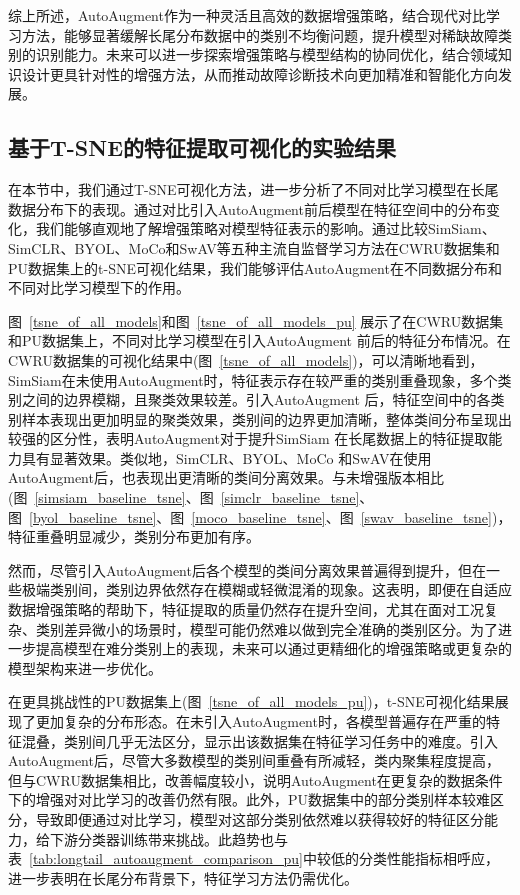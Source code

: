 \documentclass[master]{thesis-uestc}
\begin{document}
综上所述，AutoAugment作为一种灵活且高效的数据增强策略，结合现代对比学习方法，能够显著缓解长尾分布数据中的类别不均衡问题，提升模型对稀缺故障类别的识别能力。未来可以进一步探索增强策略与模型结构的协同优化，结合领域知识设计更具针对性的增强方法，从而推动故障诊断技术向更加精准和智能化方向发展。
\FloatBarrier

\subsection{基于T-SNE的特征提取可视化的实验结果}
在本节中，我们通过T-SNE可视化方法，进一步分析了不同对比学习模型在长尾数据分布下的表现。通过对比引入AutoAugment前后模型在特征空间中的分布变化，我们能够直观地了解增强策略对模型特征表示的影响。通过比较SimSiam、SimCLR、BYOL、MoCo和SwAV等五种主流自监督学习方法在CWRU数据集和PU数据集上的t-SNE可视化结果，我们能够评估AutoAugment在不同数据分布和不同对比学习模型下的作用。

图~\ref{tsne_of_all_models}和图~\ref{tsne_of_all_models_pu} 展示了在CWRU数据集和PU数据集上，不同对比学习模型在引入AutoAugment 前后的特征分布情况。在CWRU数据集的可视化结果中(图~\ref{tsne_of_all_models})，可以清晰地看到，SimSiam在未使用AutoAugment时，特征表示存在较严重的类别重叠现象，多个类别之间的边界模糊，且聚类效果较差。引入AutoAugment 后，特征空间中的各类别样本表现出更加明显的聚类效果，类别间的边界更加清晰，整体类间分布呈现出较强的区分性，表明AutoAugment对于提升SimSiam 在长尾数据上的特征提取能力具有显著效果。类似地，SimCLR、BYOL、MoCo 和SwAV在使用AutoAugment后，也表现出更清晰的类间分离效果。与未增强版本相比(图~\ref{simsiam_baseline_tsne}、图~\ref{simclr_baseline_tsne}、图~\ref{byol_baseline_tsne}、图~\ref{moco_baseline_tsne}、图~\ref{swav_baseline_tsne})，特征重叠明显减少，类别分布更加有序。

然而，尽管引入AutoAugment后各个模型的类间分离效果普遍得到提升，但在一些极端类别间，类别边界依然存在模糊或轻微混淆的现象。这表明，即便在自适应数据增强策略的帮助下，特征提取的质量仍然存在提升空间，尤其在面对工况复杂、类别差异微小的场景时，模型可能仍然难以做到完全准确的类别区分。为了进一步提高模型在难分类别上的表现，未来可以通过更精细化的增强策略或更复杂的模型架构来进一步优化。

在更具挑战性的PU数据集上(图~\ref{tsne_of_all_models_pu})，t-SNE可视化结果展现了更加复杂的分布形态。在未引入AutoAugment时，各模型普遍存在严重的特征混叠，类别间几乎无法区分，显示出该数据集在特征学习任务中的难度。引入AutoAugment后，尽管大多数模型的类别间重叠有所减轻，类内聚集程度提高，但与CWRU数据集相比，改善幅度较小，说明AutoAugment在更复杂的数据条件下的增强对对比学习的改善仍然有限。此外，PU数据集中的部分类别样本较难区分，导致即便通过对比学习，模型对这部分类别依然难以获得较好的特征区分能力，给下游分类器训练带来挑战。此趋势也与表~\ref{tab:longtail_autoaugment_comparison_pu}中较低的分类性能指标相呼应，进一步表明在长尾分布背景下，特征学习方法仍需优化。
\end{document}
